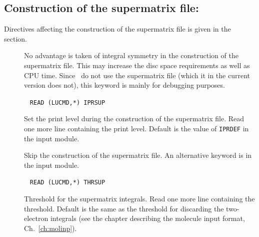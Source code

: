 
\subsection{Construction of the supermatrix file:
}\label{sec:supint}

Directives affecting the construction of the
supermatrix file is given
in the  section.

\begin{description}
\item[] No advantage is taken of integral symmetry in the
construction of the supermatrix file. This may increase the disc space
requirements as well as  CPU time. Since \aba\ do not use the
supermatrix file (which it in the current version does not), this
keyword is mainly for debugging purposes.

\item[]\verb| |\newline
\verb|READ (LUCMD,*) IPRSUP|

Set the print level during the construction of the supermatrix file.
Read one more line containing the print level. Default is the
value of \verb|IPRDEF| in the  input module.

\item[] Skip the construction of the supermatrix file.
An alternative keyword is  in the  input
module.

\item[]\verb| |\newline
\verb|READ (LUCMD,*) THRSUP|

Threshold for the supermatrix integrals. Read one more line containing
the threshold. Default is the same as the threshold for
discarding the two-electron integrals (see the chapter describing the molecule input format, Ch.~\ref{ch:molinp}).
\end{description}
